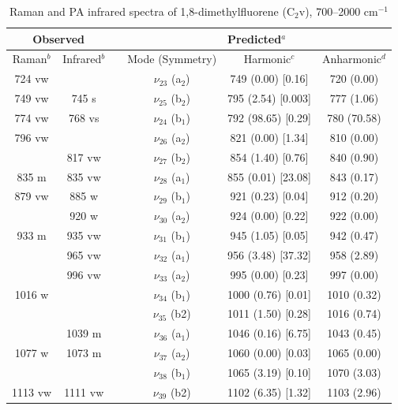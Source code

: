    \begin{table}[H]
   	\caption{Raman and PA infrared spectra of 1,8-dimethylfluorene (C$_{2}$v), 700–2000 cm$^{-1}$}
   	\begin{center}
   		\begin{tabular}{c c c c c c}
   			\hline
   			\multicolumn{ 2}{c}{Observed} & \multicolumn{1}{c}{} & \multicolumn{ 3}{c}{Predicted$^{a}$} \\ \hline
   			Raman$^{b}$ & \multicolumn{1}{c}{Infrared$^{b}$} &  & \multicolumn{1}{c}{Mode (Symmetry)} & \multicolumn{1}{c}{Harmonic$^{c}$} & Anharmonic$^{d}$ \\ \hline
724 vw &  &  & $\nu_{23}$ (a$_{2}$) & 749 (0.00) [0.16] & 720 (0.00) \\ 
749 vw & 745 s &  & $\nu_{25}$ (b$_{2}$) & 795 (2.54) [0.003] & 777 (1.06) \\ 
774 vw & 768 vs &  & $\nu_{24}$ (b$_{1}$) & 792 (98.65) [0.29] & 780 (70.58) \\ 
796 vw &  &  & $\nu_{26}$ (a$_{2}$) & 821 (0.00) [1.34] & 810 (0.00) \\ 
& 817 vw &  & $\nu_{27}$ (b$_{2}$) & 854 (1.40) [0.76] & 840 (0.90) \\ 
835 m & 835 vw &  & $\nu_{28}$ (a$_{1}$) & 855 (0.01) [23.08] & 843 (0.17) \\ 
879 vw & 885 w &  & $\nu_{29}$ (b$_{1}$) & 921 (0.23) [0.04] & 912 (0.20) \\ 
 & 920 w &  & $\nu_{30}$ (a$_{2}$) & 924 (0.00) [0.22] & 922 (0.00) \\ 
 933 m & 935 vw &  & $\nu_{31}$ (b$_{1}$) & 945 (1.05) [0.05] & 942 (0.47) \\ 
 & 965 vw &  & $\nu_{32}$ (a$_{1}$) & 956 (3.48) [37.32] & 958 (2.89) \\ 
 & 996 vw &  & $\nu_{33}$ (a$_{2}$) & 995 (0.00) [0.23] & 997 (0.00) \\ 
 1016 w &  &  & $\nu_{34}$ (b$_{1}$) & 1000 (0.76) [0.01] & 1010 (0.32) \\ 
 &  &  &  $\nu_{35}$ (b2) & 1011 (1.50) [0.28] & 1016 (0.74) \\ 
 & 1039 m &  &   $\nu_{36}$ (a$_{1}$) & 1046 (0.16) [6.75] & 1043 (0.45) \\ 
 1077 w & 1073 m &  &   $\nu_{37}$ (a$_{2}$) & 1060 (0.00) [0.03] & 1065 (0.00) \\ 
 &  &  &   $\nu_{38}$ (b$_{1}$) & 1065 (3.19) [0.10] & 1070 (3.03) \\ 
 1113 vw & 1111 vw &  & $\nu_{39}$ (b2) & 1102 (6.35) [1.32] & 1103 (2.96) \\ 

\end{tabular}
\end{center}
\end{table}
